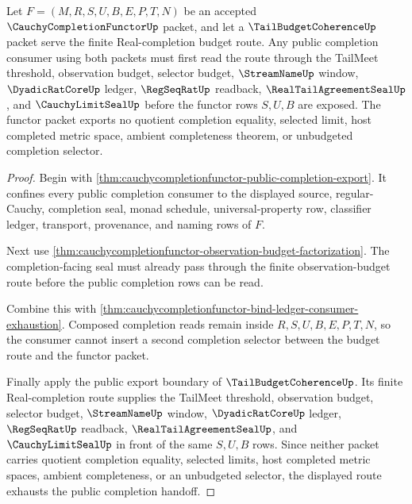 \begin{theorem}
\label{thm:cauchycompletionfunctor-tail-budget-coherence-factorization}
Let $F=(M,R,S,U,B,E,P,T,N)$ be an accepted $\CauchyCompletionFunctorUp$ packet, and let a $\TailBudgetCoherenceUp$ packet serve the finite Real-completion budget route. Any public completion consumer using both packets must first read the route through the TailMeet threshold, observation budget, selector budget, $\StreamNameUp$ window, $\DyadicRatCoreUp$ ledger, $\RegSeqRatUp$ readback, $\RealTailAgreementSealUp$, and $\CauchyLimitSealUp$ before the functor rows $S,U,B$ are exposed. The functor packet exports no quotient completion equality, selected limit, host completed metric space, ambient completeness theorem, or unbudgeted completion selector.
\end{theorem}
\begin{proof}
Begin with \autoref{thm:cauchycompletionfunctor-public-completion-export}. It confines every public completion consumer to the displayed source, regular-Cauchy, completion seal, monad schedule, universal-property row, classifier ledger, transport, provenance, and naming rows of $F$.

Next use \autoref{thm:cauchycompletionfunctor-observation-budget-factorization}. The completion-facing seal must already pass through the finite observation-budget route before the public completion rows can be read.

Combine this with \autoref{thm:cauchycompletionfunctor-bind-ledger-consumer-exhaustion}. Composed completion reads remain inside $R,S,U,B,E,P,T,N$, so the consumer cannot insert a second completion selector between the budget route and the functor packet.

Finally apply the public export boundary of $\TailBudgetCoherenceUp$. Its finite Real-completion route supplies the TailMeet threshold, observation budget, selector budget, $\StreamNameUp$ window, $\DyadicRatCoreUp$ ledger, $\RegSeqRatUp$ readback, $\RealTailAgreementSealUp$, and $\CauchyLimitSealUp$ in front of the same $S,U,B$ rows. Since neither packet carries quotient completion equality, selected limits, host completed metric spaces, ambient completeness, or an unbudgeted selector, the displayed route exhausts the public completion handoff.
\end{proof}

